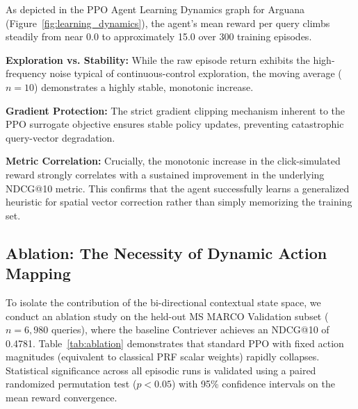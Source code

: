 As depicted in the PPO Agent Learning Dynamics graph for Arguana (Figure~\ref{fig:learning_dynamics}), the agent's mean reward per query climbs steadily from near 0.0 to approximately 15.0 over 300 training episodes.

\textbf{Exploration vs. Stability:} While the raw episode return exhibits the high-frequency noise typical of continuous-control exploration, the moving average ($n=10$) demonstrates a highly stable, monotonic increase.

\textbf{Gradient Protection:} The strict gradient clipping mechanism inherent to the PPO surrogate objective ensures stable policy updates, preventing catastrophic query-vector degradation.

\textbf{Metric Correlation:} Crucially, the monotonic increase in the click-simulated reward strongly correlates with a sustained improvement in the underlying NDCG@10 metric. This confirms that the agent successfully learns a generalized heuristic for spatial vector correction rather than simply memorizing the training set.

\subsection{Ablation: The Necessity of Dynamic Action Mapping}
To isolate the contribution of the bi-directional contextual state space, we conduct an ablation study on the held-out MS MARCO Validation subset ($n=6,980$ queries), where the baseline Contriever achieves an NDCG@10 of 0.4781. Table~\ref{tab:ablation} demonstrates that standard PPO with fixed action magnitudes (equivalent to classical PRF scalar weights) rapidly collapses. Statistical significance across all episodic runs is validated using a paired randomized permutation test ($p < 0.05$) with 95\% confidence intervals on the mean reward convergence.

\begin{table}[htbp]
  \caption{Ablation Studies}
  \begin{center}
  \end{center}
  \label{tab:ablation}
\end{table}

